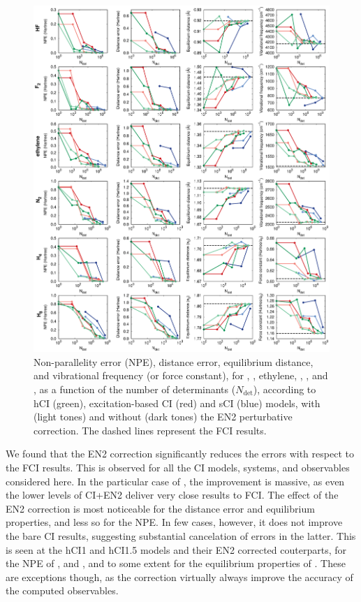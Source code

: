 \documentclass[aip,jcp,reprint,noshowkeys,superscriptaddress]{revtex4-1}
\newcommand{\Ndet}{N_\text{det}}
\begin{document}
\begin{figure}%
\includegraphics[width=1.0\linewidth]{plot_all_closed}
\caption{
Non-parallelity error (NPE), distance error, equilibrium distance, and vibrational frequency (or force constant), for , , ethylene, , , and , 
as a function of the number of determinants ($\Ndet$), according to hCI (green), excitation-based CI (red) and sCI (blue) models,
with (light tones) and without (dark tones) the EN2 perturbative correction.
The dashed lines represent the FCI results.}
\label{fig:plot_all_closed}
\end{figure}

We found that the EN2 correction significantly reduces the errors with respect to the FCI results.
This is observed for all the CI models, systems, and observables considered here.
In the particular case of , the improvement is massive, as even the lower levels of CI+EN2 deliver very close results to FCI.
The effect of the EN2 correction is most noticeable for the distance error and equilibrium properties, and less so for the NPE.
In few cases, however, it does not improve the bare CI results, suggesting substantial cancelation of errors in the latter.
This is seen at the hCI1 and hCI1.5 models and their EN2 corrected couterparts, for the NPE of ,  and , and to some extent for the equilibrium properties of .
These are exceptions though, as the correction virtually always improve the accuracy of the computed observables.
\end{document}
